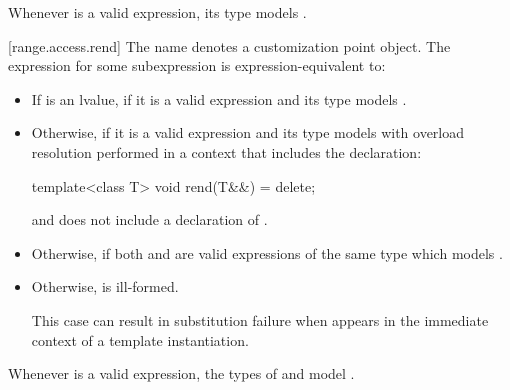 \begin{addedblock}
\pnum
\begin{note}
Whenever  is a valid expression, its type models
.
\end{note}

[range.access.rend]{}
\pnum
The name  denotes a customization point
object. The expression
 for some subexpression  is
expression-equivalent to:

\begin{itemize}
\item
  If  is an lvalue, 
  if it is a valid expression and its type  models
  .

\item
  Otherwise,  if it is a valid
  expression and its type  models
   with overload
  resolution performed in a context that includes the declaration:
  \begin{codeblock}
  template<class T> void rend(T&&) = delete;
  \end{codeblock}
  and does not include a declaration of .

\item
  Otherwise,  if both
   and  are valid
  expressions of the same type  which models
  .

\item
  Otherwise,  is ill-formed.
  {\color{newclr}
  \begin{note}
  This case can result in substitution failure when 
  appears in the immediate context of a template instantiation.
  \end{note}
  } %
\end{itemize}

\pnum
\begin{note}
Whenever  is a valid expression, the
types  of  and 
model .
\end{note}


\end{addedblock}
